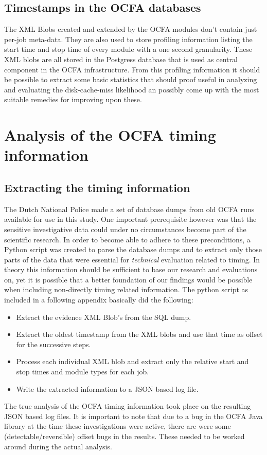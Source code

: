 \subsection{Timestamps in the OCFA databases}
The XML Blobs created and extended by the OCFA modules don't contain just per-job meta-data. They are also used to store profiling information listing the start time and stop time of every module with a one second granularity.  These XML blobs are all stored in the Postgress database that is used as central component in the OCFA infrastructure. From this profiling information it should be possible to extract some basic statistics that should proof useful in analyzing and evaluating the disk-cache-miss likelihood an possibly come up with the most suitable remedies for improving upon these.
\section{Analysis of the OCFA timing information}
\subsection{Extracting the timing information}
The Dutch National Police made a set of database dumps from old OCFA runs available for use in this study. One important prerequisite however was that the sensitive investigative data could under no circumstances become part of the scientific research. In order to become able to adhere to these preconditions, a Python script was created to parse the database dumps and to extract only those parts of the data that were essential for \emph{technical} evaluation related to timing. In theory this information should be sufficient to base our research and evaluations on, yet it is possible that a better foundation of our findings would be possible when including non-directly timing related information. The python script as included in a following appendix basically did the following:
\begin{itemize}
\item Extract the evidence XML Blob's from the SQL dump.
\item Extract the oldest timestamp from the XML blobs and use that time as offset for the successive steps.
\item Process each individual XML blob and extract only the relative start and stop times and module types for each job.
\item Write the extracted information to a JSON based log file.
\end{itemize}
The true analysis of the OCFA timing information took place on the resulting JSON based log files. It is important to note that due to a bug in the OCFA Java library at the time these investigations were active, there are were some (detectable/reversible) offset bugs in the results. These needed to be worked around during the actual analysis.




